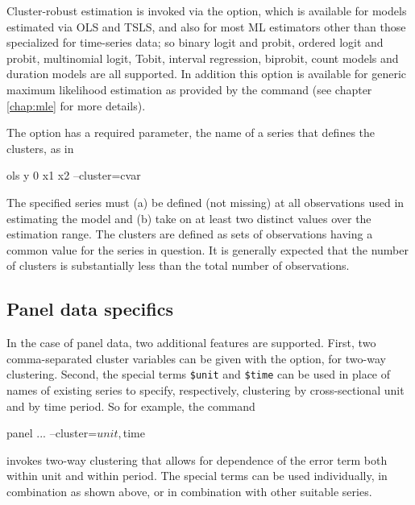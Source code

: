 Cluster-robust estimation is invoked via the  option,
which is available for models estimated via OLS and TSLS, and also for
most ML estimators other than those specialized for time-series data;
so binary logit and probit, ordered logit and probit, multinomial
logit, Tobit, interval regression, biprobit, count models and duration
models are all supported. In addition this option is available for
generic maximum likelihood estimation as provided by the 
command (see chapter \ref{chap:mle} for more details).

The  option has a required parameter, the name of a
series that defines the clusters, as in
%
\begin{code}
ols y 0 x1 x2 --cluster=cvar
\end{code}
%
The specified series must (a) be defined (not missing) at all
observations used in estimating the model and (b) take on at least two
distinct values over the estimation range. The clusters are defined as
sets of observations having a common value for the series in question.
It is generally expected that the number of clusters is substantially
less than the total number of observations.

\subsection{Panel data specifics}

In the case of panel data, two additional features are
supported. First, two comma-separated cluster variables can be given
with the  option, for two-way clustering.  Second, the
special terms \verb|$unit| and \verb|$time| can be used in place of
names of existing series to specify, respectively, clustering by
cross-sectional unit and by time period. So for example, the command
\begin{code}
panel ... --cluster=$unit,$time
\end{code}
invokes two-way clustering that allows for dependence of the error
term both within unit and within period.  The special terms can be
used individually, in combination as shown above, or in combination
with other suitable series.


